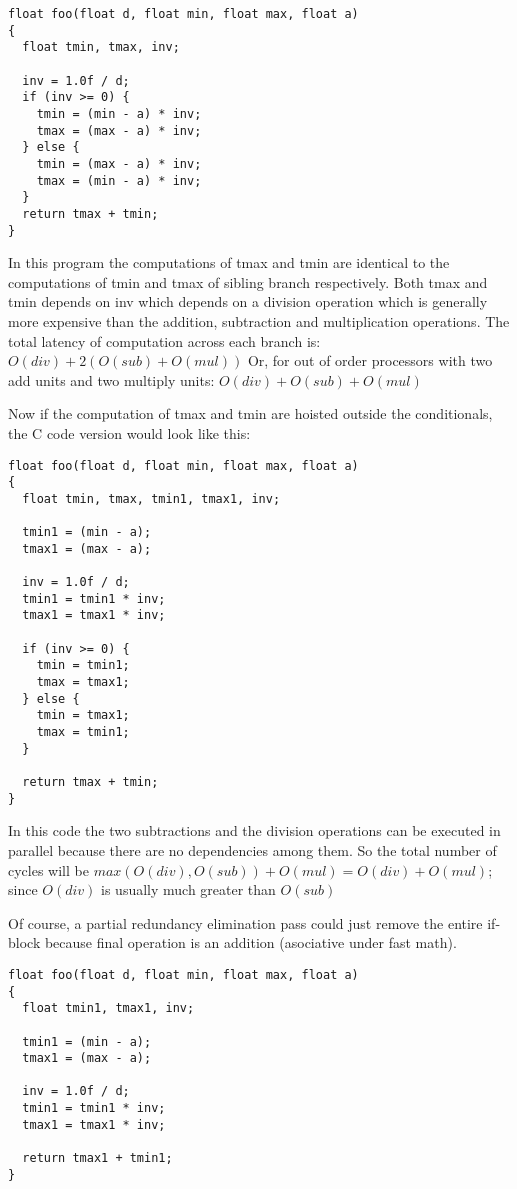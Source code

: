 \documentclass{sig-alternate}
\begin{document}
\begin{verbatim}
float foo(float d, float min, float max, float a)
{
  float tmin, tmax, inv;

  inv = 1.0f / d;
  if (inv >= 0) {
    tmin = (min - a) * inv;
    tmax = (max - a) * inv;
  } else {
    tmin = (max - a) * inv;
    tmax = (min - a) * inv;
  }
  return tmax + tmin;
}
\end{verbatim}

In this program the computations of tmax and tmin are identical to the
computations of tmin and tmax of sibling branch respectively. Both tmax and tmin
depends on inv which depends on a division operation which is generally more
expensive than the addition, subtraction and multiplication operations. The
total latency of computation across each branch is:
$O(div) + 2(O(sub) + O(mul))$
Or, for out of order processors with two add units and two multiply units:
$O(div) + O(sub) + O(mul)$

Now if the computation of tmax and tmin are hoisted outside the
conditionals, the C code version would look like this:
\begin{verbatim}
float foo(float d, float min, float max, float a)
{
  float tmin, tmax, tmin1, tmax1, inv;

  tmin1 = (min - a);
  tmax1 = (max - a);

  inv = 1.0f / d;
  tmin1 = tmin1 * inv;
  tmax1 = tmax1 * inv;

  if (inv >= 0) {
    tmin = tmin1;
    tmax = tmax1;
  } else {
    tmin = tmax1;
    tmax = tmin1;
  }

  return tmax + tmin;
}

\end{verbatim}

In this code the two subtractions and the division operations can be executed in
parallel because there are no dependencies among them. So the total number of
cycles will be $max(O(div), O(sub)) + O(mul) = O(div) + O(mul)$; since $O(div)$ is
usually much greater than $O(sub)$ \cite{x86,aarch64}

Of course, a partial redundancy elimination pass could just remove the entire
if-block because final operation is an addition (asociative under fast math).

\begin{verbatim}
float foo(float d, float min, float max, float a)
{
  float tmin1, tmax1, inv;

  tmin1 = (min - a);
  tmax1 = (max - a);

  inv = 1.0f / d;
  tmin1 = tmin1 * inv;
  tmax1 = tmax1 * inv;

  return tmax1 + tmin1;
}
\end{verbatim}
\end{document}
